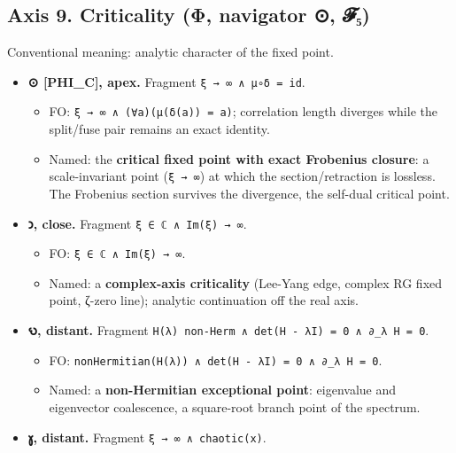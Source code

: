 \hypertarget{axis-9.-criticality-ux3c6-navigator-ux1d4d5ux2085}{%
\subsection{Axis 9. Criticality (Φ, navigator ⊙,
𝓕₅)}\label{axis-9.-criticality-ux3c6-navigator-ux1d4d5ux2085}}

Conventional meaning: analytic character of the fixed point.

\begin{itemize}
\tightlist
\item
  \textbf{⊙ {[}PHI\_C{]}, apex.} Fragment
  \texttt{ξ\ →\ ∞\ ∧\ μ∘δ\ =\ id}.

  \begin{itemize}
  \tightlist
  \item
    FO: \texttt{ξ\ →\ ∞\ ∧\ (∀a)(μ(δ(a))\ =\ a)}; correlation length
    diverges while the split/fuse pair remains an exact identity.
  \item
    Named: the \textbf{critical fixed point with exact Frobenius
    closure}: a scale-invariant point (\texttt{ξ\ →\ ∞}) at which the
    section/retraction is lossless. The Frobenius section survives the
    divergence, the self-dual critical point.
  \end{itemize}
\item
  \textbf{𐑮, close.} Fragment \texttt{ξ\ ∈\ ℂ\ ∧\ Im(ξ)\ →\ ∞}.

  \begin{itemize}
  \tightlist
  \item
    FO: \texttt{ξ\ ∈\ ℂ\ ∧\ Im(ξ)\ →\ ∞}.
  \item
    Named: a \textbf{complex-axis criticality} (Lee-Yang edge, complex
    RG fixed point, ζ-zero line); analytic continuation off the real
    axis.
  \end{itemize}
\item
  \textbf{𐑻, distant.} Fragment
  \texttt{H(λ)\ non-Herm\ ∧\ det(H\ -\ λI)\ =\ 0\ ∧\ ∂\_λ\ H\ =\ 0}.

  \begin{itemize}
  \tightlist
  \item
    FO:
    \texttt{nonHermitian(H(λ))\ ∧\ det(H\ -\ λI)\ =\ 0\ ∧\ ∂\_λ\ H\ =\ 0}.
  \item
    Named: a \textbf{non-Hermitian exceptional point}: eigenvalue and
    eigenvector coalescence, a square-root branch point of the spectrum.
  \end{itemize}
\item
  \textbf{𐑣, distant.} Fragment \texttt{ξ\ →\ ∞\ ∧\ chaotic(x)}.


\end{itemize}
